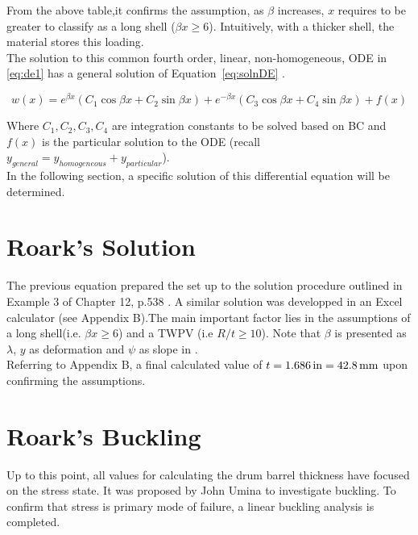 From the above table,it confirms the assumption, as $\beta$ increases, $x$ requires to be greater to classify as a long shell ($\beta x \geq 6$). Intuitively, with a thicker shell, the material stores this loading.\\


The solution to this common fourth order, linear, non-homogeneous, ODE in \ref{eq:de1} has a general solution of Equation~\ref{eq:solnDE} \cite{timoshenko1959theory}.

\begin{equation}
	\label{eq:solnDE}
	w(x)=e^{\beta x} \left(C_1 \cos \beta x +C_2 \sin \beta x \right)+e^{-\beta x} \left(C_3 \cos \beta x +C_4 \sin \beta x \right) +f(x)
\end{equation}

Where $ C_1, C_2, C_3, C_4$ are integration constants to be solved based on BC and $f(x)$ is the particular solution to the ODE (recall $y_{general}=y_{homogeneous}+y_{particular}$).\\

In the following section, a specific solution of this differential equation will be determined.


\section{Roark's Solution}
\label{section:3_roark}

The previous equation prepared the set up to the solution procedure outlined in Example 3 of Chapter 12, p.538 \cite{roarks}. A similar solution was developped in an Excel \cite{EXCEL} calculator (see Appendix B).The main important factor lies in the assumptions of a long shell(i.e. $\beta x \geq 6$) and a TWPV (i.e $R/t \geq 10$). Note that $\beta$ is presented as $\lambda$, $y$ as deformation and $\psi$ as slope in \cite{roarks}.\\

Referring to Appendix B, a final calculated value of $t=1.686 \,\mathrm{in}= 42.8 \,\mathrm{mm}$ upon confirming the assumptions.

\section{Roark's Buckling}
\label{section:3_buckle}

Up to this point, all values for calculating the drum barrel thickness have focused on the stress state. It was proposed by John Umina to investigate buckling. To confirm that stress is primary mode of failure, a linear buckling analysis is completed.\\


